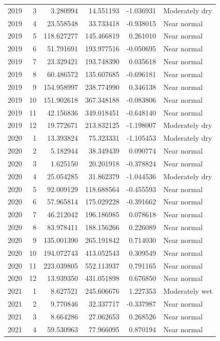 \begin{tabular}{rrrrrl}
2019 & 3 & 3.280994 & 14.551193 & -1.036931 & Moderately dry \\
2019 & 4 & 23.558548 & 33.733418 & -0.938015 & Near normal \\
2019 & 5 & 118.627277 & 145.466819 & 0.261010 & Near normal \\
2019 & 6 & 51.791691 & 193.977516 & -0.050695 & Near normal \\
2019 & 7 & 23.329421 & 193.748390 & 0.035618 & Near normal \\
2019 & 8 & 60.486572 & 135.607685 & -0.696181 & Near normal \\
2019 & 9 & 154.958997 & 238.774990 & 0.346138 & Near normal \\
2019 & 10 & 151.902618 & 367.348188 & -0.083806 & Near normal \\
2019 & 11 & 42.156836 & 349.018451 & -0.648140 & Near normal \\
2019 & 12 & 19.772671 & 213.832125 & -1.198007 & Moderately dry \\
2020 & 1 & 13.393824 & 75.323331 & -1.105453 & Moderately dry \\
2020 & 2 & 5.182944 & 38.349439 & 0.090774 & Near normal \\
2020 & 3 & 1.625150 & 20.201918 & -0.378824 & Near normal \\
2020 & 4 & 25.054285 & 31.862379 & -1.044536 & Moderately dry \\
2020 & 5 & 92.009129 & 118.688564 & -0.455593 & Near normal \\
2020 & 6 & 57.965814 & 175.029228 & -0.391662 & Near normal \\
2020 & 7 & 46.212042 & 196.186985 & 0.078618 & Near normal \\
2020 & 8 & 83.978411 & 188.156266 & 0.226089 & Near normal \\
2020 & 9 & 135.001390 & 265.191842 & 0.714030 & Near normal \\
2020 & 10 & 194.072743 & 413.052543 & 0.309549 & Near normal \\
2020 & 11 & 223.039805 & 552.113937 & 0.791165 & Near normal \\
2020 & 12 & 13.939350 & 431.051898 & 0.676850 & Near normal \\
2021 & 1 & 8.627521 & 245.606676 & 1.227353 & Moderately wet \\
2021 & 2 & 9.770846 & 32.337717 & -0.337987 & Near normal \\
2021 & 3 & 8.664286 & 27.062653 & 0.268526 & Near normal \\
2021 & 4 & 59.530963 & 77.966095 & 0.870194 & Near normal \\

\end{tabular}

